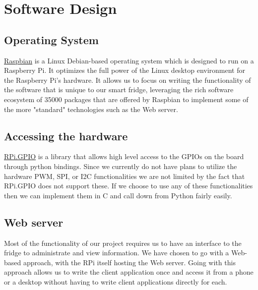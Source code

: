 \documentclass[10pt]{article}
\begin{document}
{\section{Software Design}
\subsection{Operating System}
\href{https://www.raspbian.org/}{Raspbian} is a Linux Debian-based operating system which is designed to run on a Raspberry Pi. It optimizes the full power of the Linux desktop environment for the Raspberry Pi's hardware. It allows us to focus on writing the functionality of the software that is unique to our smart fridge, leveraging the rich software ecosystem of 35000 packages that are offered by Raspbian to implement some of the more "standard" technologies such as the Web server.

\subsection{Accessing the hardware}
\href{https://pypi.python.org/pypi/RPi.GPIO}{RPi.GPIO} is a library that allows high level access to the GPIOs on the board through python bindings. Since we currently do not have plans to utilize the hardware PWM, SPI, or I2C functionalities we are not limited by the fact that RPi.GPIO does not support these. If we choose to use any of these functionalities then we can implement them in C and call down from Python fairly easily.

\subsection{Web server}

Most of the functionality of our project requires us to have an interface to the fridge to administrate and view information. We have chosen to go with a Web-based approach, with the RPi itself hosting the Web server. Going with this approach allows us to write the client application once and access it from a phone or a desktop without having to write client applications directly for each.

}
\end{document}
